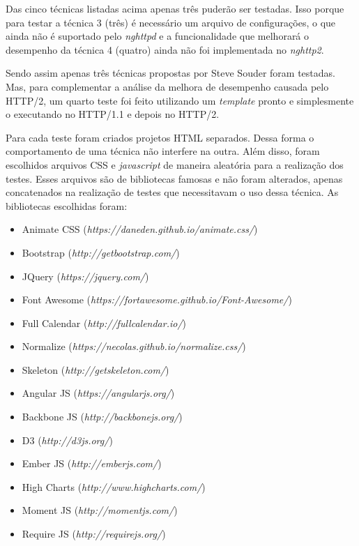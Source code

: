 Das cinco técnicas listadas acima apenas três puderão ser testadas. Isso porque para testar a técnica 3 (três) é necessário um arquivo de configurações, o que ainda não é suportado pelo \textit{nghttpd} e a funcionalidade que melhorará o desempenho da técnica 4 (quatro) ainda não foi implementada no \textit{nghttp2}.

Sendo assim apenas três técnicas propostas por Steve Souder foram testadas. Mas, para complementar a análise da melhora de desempenho causada pelo HTTP/2, um quarto teste foi feito utilizando um \textit{template} pronto e simplesmente o executando no HTTP/1.1 e depois no HTTP/2.

Para cada teste foram criados projetos HTML separados. Dessa forma o comportamento de uma técnica não interfere na outra. Além disso, foram escolhidos arquivos CSS e \textit{javascript} de maneira aleatória para a realização dos testes. Esses arquivos são de bibliotecas famosas e não foram alterados, apenas concatenados na realização de testes que necessitavam o uso dessa técnica. As bibliotecas escolhidas foram:

\begin{itemize}
	\item Animate CSS (\textit{https://daneden.github.io/animate.css/})
	\item Bootstrap (\textit{http://getbootstrap.com/})
	\item JQuery (\textit{https://jquery.com/})
	\item Font Awesome (\textit{https://fortawesome.github.io/Font-Awesome/})
	\item Full Calendar (\textit{http://fullcalendar.io/})
	\item Normalize (\textit{https://necolas.github.io/normalize.css/})
	\item Skeleton (\textit{http://getskeleton.com/})
	\item Angular JS (\textit{https://angularjs.org/})
	\item Backbone JS (\textit{http://backbonejs.org/})
	\item D3 (\textit{http://d3js.org/})
	\item Ember JS (\textit{http://emberjs.com/})
	\item High Charts (\textit{http://www.highcharts.com/})
	\item Moment JS (\textit{http://momentjs.com/})
	\item Require JS (\textit{http://requirejs.org/})
\end{itemize}


